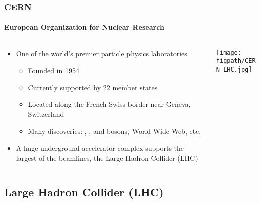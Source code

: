 \begin{frame}
    \frametitle{CERN}
    \framesubtitle{European Organization for Nuclear Research}
    \vspace*{-0.44cm}
    \begin{columns}[T]
        \begin{column}{0.4\textwidth}
            \begin{block}{}
                \begin{itemize}
                    \item One of the world's premier particle physics laboratories
                    \begin{itemize}
                        \item Founded in 1954
                        \item Currently supported by 22 member states
                        \item Located along the French-Swiss border near Geneva, Switzerland
                        \item Many discoveries: \PW, \PZ, and \PH bosons, World Wide Web, etc.
                    \end{itemize}
                    \vspace*{0.2cm}
                    \item A huge underground accelerator complex supports the largest of the beamlines, the Large Hadron Collider (LHC)
                \end{itemize}
            \end{block}
        \end{column}
        \begin{column}{0.58\textwidth}
            \centering
            \vspace*{1.0cm}
            \hspace*{0.1cm}\texttt{[image: \\figpath/CERN-LHC.jpg]}
        \end{column}
    \end{columns}
\end{frame}


\subsection*{Large Hadron Collider (LHC)}


